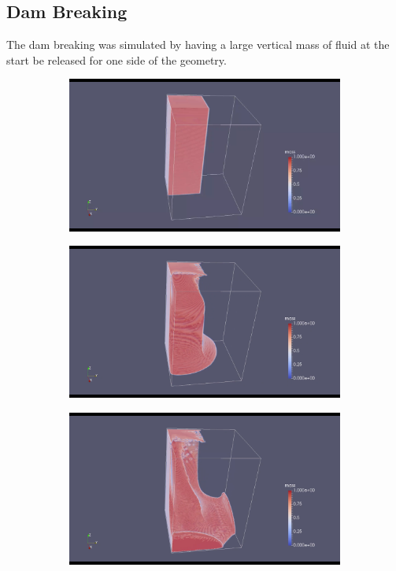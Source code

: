 \documentclass[10pt,a4paper,notitlepage]{article}
\begin{document}
\subsection{Dam Breaking}
The dam breaking was simulated by having a large vertical mass of fluid at the start be released for one side of the geometry.
\begin{figure}[H]
\centering
\begin{subfigure}{0.25\textwidth}
  \includegraphics[width=1.0\linewidth]{dam/1.png}
\end{subfigure}%
\begin{subfigure}{0.25\textwidth}
  \includegraphics[width=1.0\linewidth]{dam/2.png}
\end{subfigure}
\begin{subfigure}{0.25\textwidth}
  \includegraphics[width=1.0\linewidth]{dam/3.png}

\end{subfigure}
\end{figure}
\end{document}
